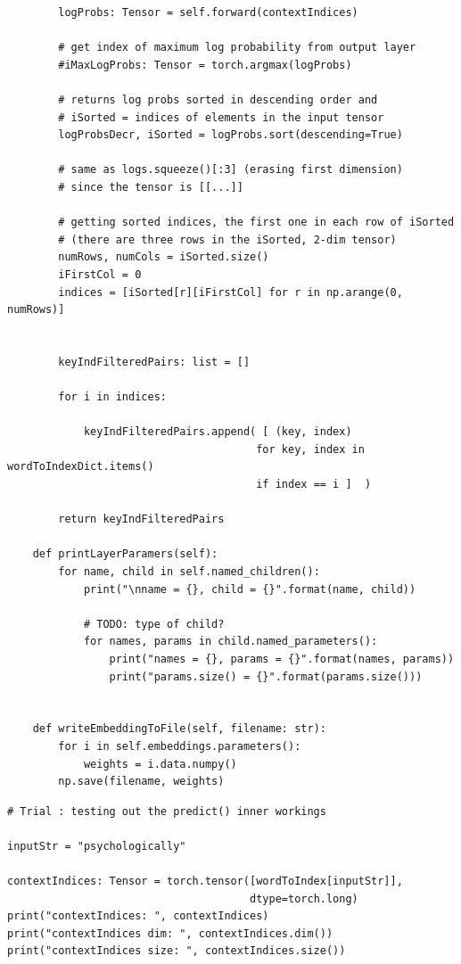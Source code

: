 \documentclass[
]{article}
\begin{document}
\begin{verbatim}
        logProbs: Tensor = self.forward(contextIndices)

        # get index of maximum log probability from output layer
        #iMaxLogProbs: Tensor = torch.argmax(logProbs)

        # returns log probs sorted in descending order and
        # iSorted = indices of elements in the input tensor
        logProbsDecr, iSorted = logProbs.sort(descending=True)

        # same as logs.squeeze()[:3] (erasing first dimension)
        # since the tensor is [[...]]

        # getting sorted indices, the first one in each row of iSorted
        # (there are three rows in the iSorted, 2-dim tensor)
        numRows, numCols = iSorted.size()
        iFirstCol = 0
        indices = [iSorted[r][iFirstCol] for r in np.arange(0, numRows)]


        keyIndFilteredPairs: list = []

        for i in indices:

            keyIndFilteredPairs.append( [ (key, index)
                                       for key, index in wordToIndexDict.items()
                                       if index == i ]  )

        return keyIndFilteredPairs

    def printLayerParamers(self):
        for name, child in self.named_children():
            print("\nname = {}, child = {}".format(name, child))

            # TODO: type of child?
            for names, params in child.named_parameters():
                print("names = {}, params = {}".format(names, params))
                print("params.size() = {}".format(params.size()))


    def writeEmbeddingToFile(self, filename: str):
        for i in self.embeddings.parameters():
            weights = i.data.numpy()
        np.save(filename, weights)
\end{verbatim}

\begin{verbatim}
# Trial : testing out the predict() inner workings

inputStr = "psychologically"

contextIndices: Tensor = torch.tensor([wordToIndex[inputStr]],
                                      dtype=torch.long)
print("contextIndices: ", contextIndices)
print("contextIndices dim: ", contextIndices.dim())
print("contextIndices size: ", contextIndices.size())


\end{verbatim}
\end{document}
